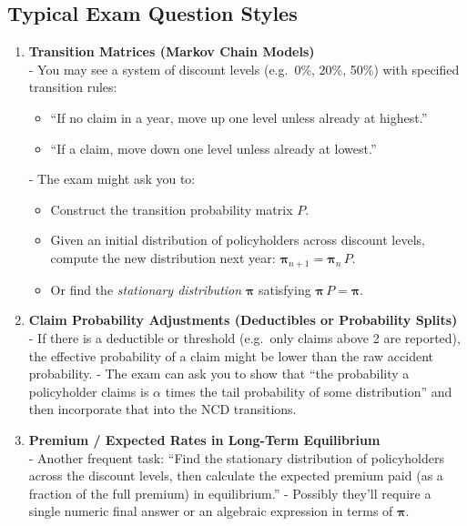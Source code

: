 \documentclass[13pt,a4paper]{article}
\begin{document}
\subsection{Typical Exam Question Styles}
\begin{enumerate}
  \item \textbf{Transition Matrices (Markov Chain Models)}\\
    - You may see a system of discount levels (e.g.\ 0\%, 20\%, 50\%) with specified transition rules:  
      \begin{itemize}
        \item “If no claim in a year, move up one level unless already at highest.”  
        \item “If a claim, move down one level unless already at lowest.”  
      \end{itemize}
    - The exam might ask you to:
      \begin{itemize}
        \item Construct the transition probability matrix \(P\).  
        \item Given an initial distribution of policyholders across discount levels, compute the new distribution next year: \(\boldsymbol{\pi}_{n+1} = \boldsymbol{\pi}_{n} \, P\).  
        \item Or find the \emph{stationary distribution} \(\boldsymbol{\pi}\) satisfying \(\boldsymbol{\pi}\,P=\boldsymbol{\pi}\).
      \end{itemize}

  \item \textbf{Claim Probability Adjustments (Deductibles or Probability Splits)}\\
    - If there is a deductible or threshold (e.g.\ only claims above 2 are reported), the effective probability of a claim might be lower than the raw accident probability.  
    - The exam can ask you to show that “the probability a policyholder claims is \(\alpha\) times the tail probability of some distribution” and then incorporate that into the NCD transitions.

  \item \textbf{Premium / Expected Rates in Long-Term Equilibrium} \\
    - Another frequent task: “Find the stationary distribution of policyholders across the discount levels, then calculate the expected premium paid (as a fraction of the full premium) in equilibrium.”  
    - Possibly they’ll require a single numeric final answer or an algebraic expression in terms of \(\boldsymbol{\pi}\).


\end{enumerate}
\end{document}
